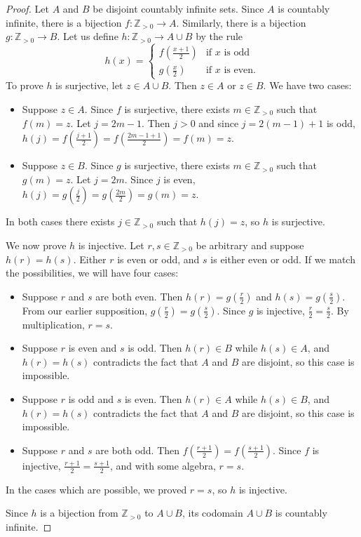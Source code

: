 \documentclass{book}
\theoremstyle{ekimcustom}
\begin{document}
\begin{proof}
Let $A$ and $B$ be disjoint countably infinite sets. Since $A$ is countably infinite, there is a bijection $f : \mathbb{Z}_{>0} \to A$. Similarly, there is a bijection $g : \mathbb{Z}_{>0} \to B$. Let us define $h : \mathbb{Z}_{>0} \to A \cup B$ by the rule
\[
h(x) = \left\{
\begin{array}{ll}
f(\frac{x+1}{2}) & \text{if } x \text{ is odd}\\
g(\frac{x}{2}) & \text{if } x \text{ is even}.
\end{array}
\right.
\]
To prove $h$ is surjective, let $z \in A \cup B$. Then $z \in A$ or $z \in B$. We have two cases:
\begin{itemize}
\item Suppose $z \in A$. Since $f$ is surjective, there exists $m \in \mathbb{Z}_{>0}$ such that $f(m)=z$. Let $j = 2m-1$. Then $j > 0$ and since $j = 2(m-1)+1$ is odd, $h(j)=f(\frac{j+1}{2})=f(\frac{2m-1+1}{2})=f(m)=z$.
\item Suppose $z \in B$. Since $g$ is surjective, there exists $m \in \mathbb{Z}_{>0}$ such that $g(m)=z$. Let $j=2m$. Since $j$ is even, $h(j)=g(\frac{j}{2})=g(\frac{2m}{2})=g(m)=z$.
\end{itemize}
In both cases there exists $j \in \mathbb{Z}_{>0}$ such that $h(j)=z$, so $h$ is surjective.

We now prove $h$ is injective. Let $r,s \in \mathbb{Z}_{>0}$ be arbitrary and suppose $h(r)=h(s)$. Either $r$ is even or odd, and $s$ is either even or odd. If we match the possibilities, we will have four cases:
\begin{itemize}
\item Suppose $r$ and $s$ are both even. Then $h(r)=g(\frac{r}{2})$ and $h(s)=g(\frac{s}{2})$. From our earlier supposition, $g(\frac{r}{2})=g(\frac{s}{2})$. Since $g$ is injective, $\frac{r}{2}=\frac{s}{2}$. By multiplication, $r=s$.
\item Suppose $r$ is even and $s$ is odd. Then $h(r) \in B$ while $h(s) \in A$, and $h(r)=h(s)$ contradicts the fact that $A$ and $B$ are disjoint, so this case is impossible.
\item Suppose $r$ is odd and $s$ is even. Then $h(r) \in A$ while $h(s) \in B$, and $h(r)=h(s)$ contradicts the fact that $A$ and $B$ are disjoint, so this case is impossible.
\item Suppose $r$ and $s$ are both odd. Then $f(\frac{r+1}{2})=f(\frac{s+1}{2})$. Since $f$ is injective, $\frac{r+1}{2}=\frac{s+1}{2}$, and with some algebra, $r=s$.
\end{itemize}
In the cases which are possible, we proved $r=s$, so $h$ is injective.

Since $h$ is a bijection from $\mathbb{Z}_{>0}$ to $A \cup B$, its codomain $A \cup B$ is countably infinite.
\end{proof}
\end{document}
